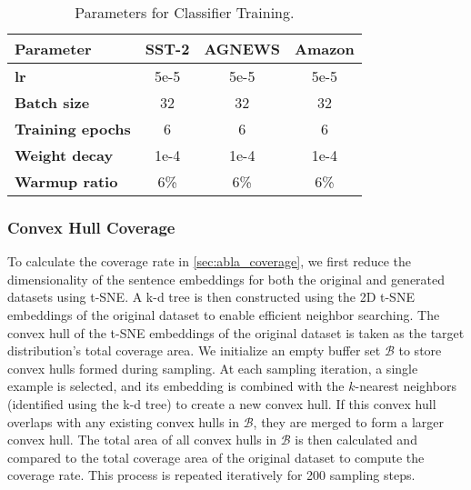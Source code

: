 

\begin{table}[bp]
	\centering
	\caption{Parameters for Classifier Training.}
	\label{tab:classifier_params}
	\begin{tabular}{lccc}
		\toprule
		\textbf{Parameter} & \textbf{SST-2} & \textbf{AGNEWS} & \textbf{Amazon} \\
		\midrule
		\textbf{lr} & 5e-5 & 5e-5 & 5e-5 \\
		\textbf{Batch size} & 32 & 32 & 32 \\
		\textbf{Training epochs} & 6 & 6 & 6 \\
		\textbf{Weight decay} & 1e-4 & 1e-4 & 1e-4 \\
		\textbf{Warmup ratio} & 6\% & 6\% & 6\% \\
		\bottomrule
	\end{tabular}
\end{table}






\subsubsection{Convex Hull Coverage}
\label{apdx:convex}

To calculate the coverage rate in \ref{sec:abla_coverage}, we first reduce the dimensionality of the sentence embeddings for both the original and generated datasets using t-SNE. A k-d tree is then constructed using the 2D t-SNE embeddings of the original dataset to enable efficient neighbor searching. The convex hull of the t-SNE embeddings of the original dataset is taken as the target distribution's total coverage area. We initialize an empty buffer set $\mathcal{B}$ to store convex hulls formed during sampling. At each sampling iteration, a single example is selected, and its embedding is combined with the $k$-nearest neighbors (identified using the k-d tree) to create a new convex hull. If this convex hull overlaps with any existing convex hulls in $\mathcal{B}$, they are merged to form a larger convex hull. The total area of all convex hulls in $\mathcal{B}$ is then calculated and compared to the total coverage area of the original dataset to compute the coverage rate. This process is repeated iteratively for 200 sampling steps.


